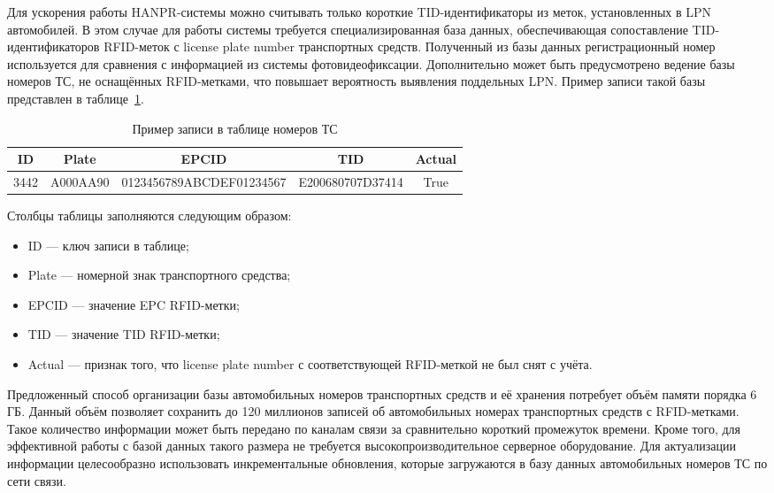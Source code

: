 \documentclass[12pt]{article}
\theoremstyle{definition}
\begin{document}
Для ускорения работы HANPR-системы можно считывать только короткие TID-идентификаторы из меток, установленных в LPN автомобилей. В этом случае для работы системы требуется специализированная база данных, обеспечивающая сопоставление TID-идентификаторов RFID-меток с license plate number транспортных средств. Полученный из базы данных регистрационный номер используется для сравнения с информацией из системы фотовидеофиксации. Дополнительно может быть предусмотрено ведение базы номеров ТС, не оснащённых RFID-метками, что повышает вероятность выявления поддельных LPN. Пример записи такой базы представлен в таблице~\ref{tab:rfid_db}.

\begin{table}[h]
\centering
\caption{Пример записи в таблице номеров ТС}
\label{tab:rfid_db}
\begin{tabular}{|c|c|c|c|c|}
\hline
ID & Plate & EPCID & TID & Actual \\
\hline
3442 &
A000AA90 &
0123456789ABCDEF01234567 &
E200680707D37414 &
True \\
\hline
\end{tabular}
\end{table}

Столбцы таблицы заполняются следующим образом:

\begin{itemize}
\item ID --- ключ записи в таблице;
\item Plate --- номерной знак транспортного средства;
\item EPCID --- значение EPC RFID-метки;
\item TID --- значение TID RFID-метки;
\item Actual --- признак того, что license plate number с соответствующей RFID-меткой не был снят с учёта.
\end{itemize}

Предложенный способ организации базы автомобильных номеров транспортных средств и её хранения потребует объём памяти порядка 6 ГБ. Данный объём позволяет сохранить до 120 миллионов записей об автомобильных номерах транспортных средств с RFID-метками. Такое количество информации может быть передано по каналам связи за сравнительно короткий промежуток времени. Кроме того, для эффективной работы с базой данных такого размера не требуется высокопроизводительное серверное оборудование. Для актуализации информации целесообразно использовать инкрементальные обновления, которые загружаются в базу данных автомобильных номеров ТС по сети связи.
\end{document}

